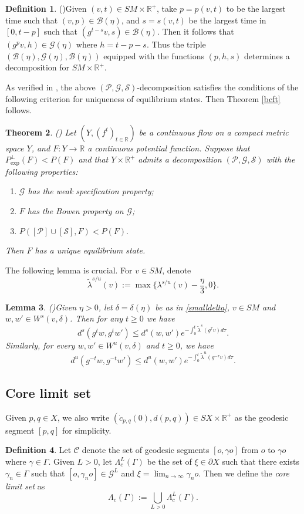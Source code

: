 \documentclass[11pt]{amsart}
\newtheorem{theorem}{Theorem}[section]
\newtheorem{lemma}[theorem]{Lemma}
\theoremstyle{definition}
\newtheorem{definition}[theorem]{Definition}
\newcommand{\CCC}{\mathcal{C}}
\newcommand{\PPP}{\mathcal{P}}
\newcommand{\SSS}{\mathcal{S}}
\newcommand{\BBB}{\mathcal{B}}
\newcommand{\GGG}{\mathcal{G}}
\def\P{{\mathcal P}}
\def\p{{\partial}}
\def\RR{{\mathbb R}}
\def\c{\gamma}   \def\C{\Gamma}
\def\l{\lambda}   \def\L{\Lambda}
\begin{document}
\begin{definition}(\cite[p. 1221]{BCFT})\label{decom}
Given $(v,t)\in SM\times\RR^+$, take $p=p(v,t)$ to be the largest time such that $(v,p)\in \BBB(\eta)$, and $s=s(v,t)$ be the largest time in $[0, t-p]$ such that $(g^{t-s}v, s)\in \BBB(\eta)$. Then it follows that $(g^pv, h)\in \GGG(\eta)$ where $h=t-p-s$. Thus the triple $(\BBB(\eta), \GGG(\eta), \BBB(\eta))$ equipped with the functions $(p,h,s)$ determines a decomposition for $SM\times \RR^+$.
\end{definition}

As verified in \cite{BCFT}, the above $(\P, \GGG,\SSS)$-decomposition satisfies the conditions of the following criterion for uniqueness of equilibrium states. Then Theorem \ref{bcft} follows.
\begin{theorem}(\cite[Theorem A]{CT16})
 Let $(Y, (f^t)_{t\in \RR})$ be a continuous flow on a compact metric space $Y$, and $F: Y\to \RR$ a continuous potential function. Suppose that $P^{\perp}_{\exp}(F) <P(F)$ and that $Y\times \RR^+$ admits 
a decomposition $(\PPP, \GGG, \SSS)$ with the following properties:
\begin{enumerate}
    \item $\GGG$ has the weak specification property;
    \item $F$ has the Bowen property on $\GGG$; 
    \item  $P([\PPP]\cup [\SSS], F)<P(F).$
\end{enumerate}
  Then $F$ has a unique equilibrium state.   
\end{theorem}
The following lemma is crucial. For $v\in SM$, denote 
$$\tilde{\l}^{s/u}(v):=\max\{\l^{s/u}(v)-\frac{\eta}{3}, 0\}.$$
\begin{lemma}(\cite[Lemma 3.10]{BCFT})\label{stablegeo}
Given $\eta>0$, let $\delta=\delta(\eta)$ be as in \eqref{smalldelta}, $v\in SM$ and $w,w'\in W^s(v,\delta)$. Then for any $t\ge 0$ we have
$$d^s(g^tw, g^tw')\le d^s(w,w')e^{-\int_0^t\tilde\l^s(g^\tau v)d\tau}.$$
Similarly, for every $w,w'\in W^u(v,\delta)$ and $t\ge 0$, we have
$$d^u(g^{-t}w, g^{-t}w')\le d^u(w,w')e^{-\int_0^t\tilde\l^u(g^{-\tau} v)d\tau}.$$
\end{lemma} 


\subsection{Core limit set}
Given $p,q\in X$, we also write $(\dot c_{p,q}(0), d(p,q))\in SX\times \RR^+$ as the geodesic segment $[p,q]$ for simplicity. 
\begin{definition}\label{corelimit}
Let $\CCC$ denote the set of geodesic segments $[o,\c o]$ from $o$ to $\c o$ where $\c\in \C$. Given $L>0$, let $\L_c^L(\C)$ be the set of $\xi\in \p X$ such that there exists $\c_n\in \C$ such that $[o,\c_no]\in \GGG^L$ and $\xi=\lim_{n\to \infty}\c_no.$
Then we define the \emph{core limit set} as
$$\L_c(\C):=\bigcup_{L>0}\L_c^L(\C).$$
\end{definition}
\end{document}
